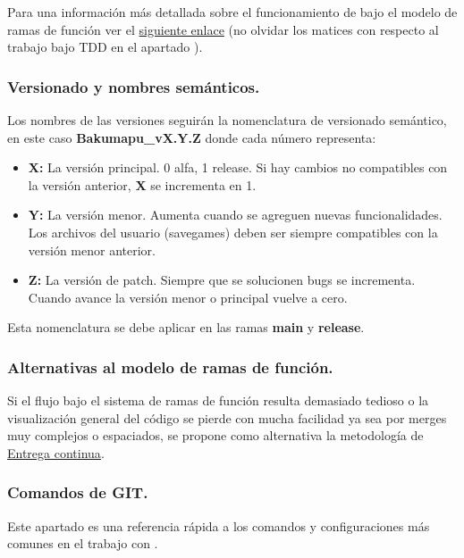 Para una información más detallada sobre el funcionamiento de  bajo el modelo de ramas de función ver el \href{https://www.atlassian.com/es/git/tutorials/comparing-workflows/feature-branch-workflow}{siguiente enlace} (no olvidar los matices con respecto al trabajo bajo TDD en el apartado ).

\subsubsection{Versionado y nombres semánticos.}\label{flujo:versionado-y-nombres}
Los nombres de las versiones seguirán la nomenclatura de versionado semántico, en este caso \textbf{Bakumapu\_vX.Y.Z} donde cada número representa:
\begin{itemize}[label=-]
	\item \textbf{X:} La versión principal. 0 alfa, 1 release. Si hay cambios no compatibles con la versión anterior, \textbf{X} se incrementa en 1.
	\item \textbf{Y:} La versión menor. Aumenta cuando se agreguen nuevas funcionalidades. Los archivos del usuario (savegames) deben ser siempre compatibles con la versión menor anterior.
	\item \textbf{Z:} La versión de patch. Siempre que se solucionen bugs se incrementa. Cuando avance la versión menor o principal vuelve a cero.
\end{itemize}

Esta nomenclatura se debe aplicar en las ramas \textbf{main} y \textbf{release}.

\subsubsection{Alternativas al modelo de ramas de función.}\label{flujo:alternativas-al-branching}
Si el flujo bajo el sistema de ramas de función resulta demasiado tedioso o la visualización general del código se pierde con mucha facilidad ya sea por merges muy complejos o espaciados, se propone como alternativa la metodología de \href{https://es.wikipedia.org/wiki/Entrega_continua}{Entrega continua}.

\subsubsection{Comandos de GIT.}\label{flujo:comandos-de-git}
Este apartado es una referencia rápida a los comandos y configuraciones más comunes en el trabajo con .

